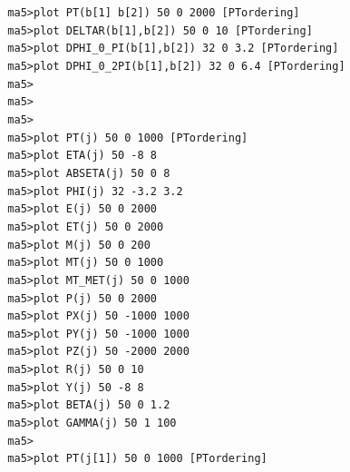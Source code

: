 \documentclass[a4paper, 10pt]{article}
\begin{document}
\texttt{ }\texttt{ }\texttt{ma5>plot PT(b[1] b[2]) 50 0 2000 [PTordering]\\
}
\texttt{ }\texttt{ }\texttt{ma5>plot DELTAR(b[1],b[2])      50 0 10 [PTordering]\\
}
\texttt{ }\texttt{ }\texttt{ma5>plot DPHI\_0\_PI(b[1],b[2])   32 0 3.2 [PTordering]\\
}
\texttt{ }\texttt{ }\texttt{ma5>plot DPHI\_0\_2PI(b[1],b[2])  32 0 6.4 [PTordering]\\
}
\texttt{ }\texttt{ }\texttt{ma5>\\
}
\texttt{ }\texttt{ }\texttt{ma5>\\
}
\texttt{ }\texttt{ }\texttt{ma5>\\
}
\texttt{ }\texttt{ }\texttt{ma5>plot PT(j)       50 0 1000 [PTordering]\\
}
\texttt{ }\texttt{ }\texttt{ma5>plot ETA(j)      50 -8 8\\
}
\texttt{ }\texttt{ }\texttt{ma5>plot ABSETA(j)   50 0 8\\
}
\texttt{ }\texttt{ }\texttt{ma5>plot PHI(j)      32 -3.2 3.2\\
}
\texttt{ }\texttt{ }\texttt{ma5>plot E(j)        50 0 2000\\
}
\texttt{ }\texttt{ }\texttt{ma5>plot ET(j)       50 0 2000\\
}
\texttt{ }\texttt{ }\texttt{ma5>plot M(j)        50 0 200\\
}
\texttt{ }\texttt{ }\texttt{ma5>plot MT(j)       50 0 1000\\
}
\texttt{ }\texttt{ }\texttt{ma5>plot MT\_MET(j)   50 0 1000\\
}
\texttt{ }\texttt{ }\texttt{ma5>plot P(j)        50 0 2000\\
}
\texttt{ }\texttt{ }\texttt{ma5>plot PX(j)       50 -1000 1000\\
}
\texttt{ }\texttt{ }\texttt{ma5>plot PY(j)       50 -1000 1000\\
}
\texttt{ }\texttt{ }\texttt{ma5>plot PZ(j)       50 -2000 2000\\
}
\texttt{ }\texttt{ }\texttt{ma5>plot R(j)        50 0 10\\
}
\texttt{ }\texttt{ }\texttt{ma5>plot Y(j)        50 -8 8\\
}
\texttt{ }\texttt{ }\texttt{ma5>plot BETA(j)     50 0 1.2\\
}
\texttt{ }\texttt{ }\texttt{ma5>plot GAMMA(j)    50 1 100\\
}
\texttt{ }\texttt{ }\texttt{ma5>\\
}
\texttt{ }\texttt{ }\texttt{ma5>plot PT(j[1])      50 0 1000 [PTordering]\\
}
\end{document}
